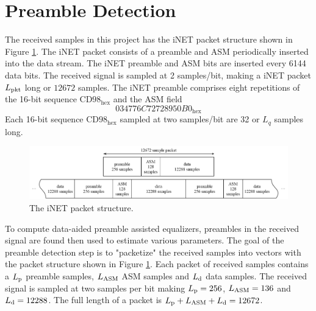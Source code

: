 \section{Preamble Detection}
\label{sec:preamble_detection}
The received samples in this project has the iNET packet structure shown in Figure \ref{fig:packet}.
The iNET packet consists of a preamble and ASM periodically inserted into the data stream.
The iNET preamble and ASM bits are inserted every 6144 data bits.
The received signal is sampled at 2 samples/bit, making a iNET packet $L_\text{pkt}$ long or $12672$ samples.
The iNET preamble comprises eight repetitions of the 16-bit sequence $\text{CD98}_\text{hex}$ and the ASM field
\begin{equation}
034776C72728950B0_\text{hex}
\end{equation}
Each 16-bit sequence $\text{CD98}_\text{hex}$ sampled at two samples/bit are 32 or $L_q$ samples long.
\begin{figure}
	\centering\includegraphics[width=\textwidth/10*10]{figures/gpu/packet.png}
	\caption{The iNET packet structure.}
	\label{fig:packet}
\end{figure}

To compute data-aided preamble assisted equalizers, preambles in the received signal are found then used to estimate various parameters.
The goal of the preamble detection step is to "packetize" the received samples into vectors with the packet structure shown in Figure \ref{fig:packet}. 
Each packet of received samples contains a $L_\text{p}$ preamble samples, $L_\text{ASM}$ ASM samples and $L_\text{d}$ data samples.
The received signal is sampled at two samples per bit making $L_\text{p} = 256$, $L_\text{ASM} = 136$ and $L_\text{d} = 12288$. 
The full length of a packet is $L_\text{p} + L_\text{ASM} + L_\text{d} = 12672$.


